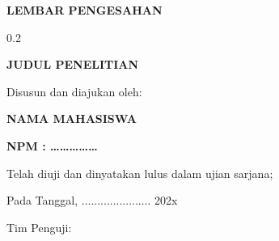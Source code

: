 \thispagestyle{empty}
\begin{tengah}
\textbf{LEMBAR PENGESAHAN}
\end{tengah}
\begin{ruang}{0.2}\end{ruang}
\begin{tengah}
\textbf{JUDUL PENELITIAN}

Disusun dan diajukan oleh:

\textbf{NAMA MAHASISWA}

\textbf{NPM : ……………}

Telah diuji dan dinyatakan lulus dalam ujian sarjana;

Pada Tanggal, ...................... 202x

Tim Penguji:
\end{tengah}
